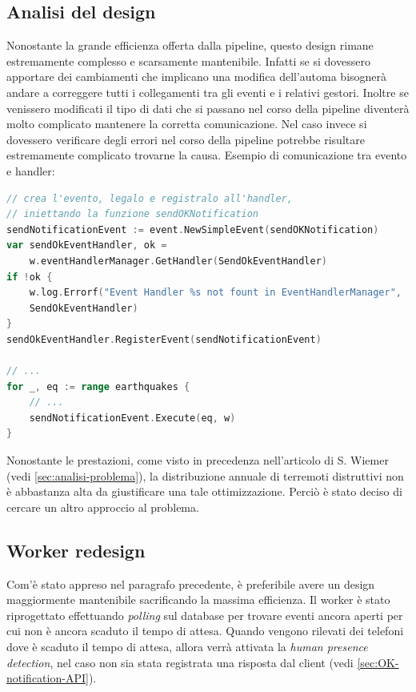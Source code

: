 \documentclass[main.tex]{subfiles}
\begin{document}
\subsection{Analisi del design}
Nonostante la grande efficienza offerta dalla pipeline, questo design rimane estremamente complesso e scarsamente mantenibile. Infatti se si dovessero apportare dei cambiamenti che implicano una modifica dell'automa bisognerà andare a correggere tutti i collegamenti tra gli eventi e i relativi gestori. Inoltre se venissero modificati il tipo di dati che si passano nel corso della pipeline diventerà molto complicato mantenere la corretta comunicazione. Nel caso invece si dovessero verificare degli errori nel corso della pipeline potrebbe risultare estremamente complicato trovarne la causa.\newline
Esempio di comunicazione tra evento e handler: %
\begin{lstlisting}[language=go]
// crea l'evento, legalo e registralo all'handler, 
// iniettando la funzione sendOKNotification
sendNotificationEvent := event.NewSimpleEvent(sendOKNotification)
var sendOkEventHandler, ok = 
    w.eventHandlerManager.GetHandler(SendOkEventHandler)
if !ok {
    w.log.Errorf("Event Handler %s not fount in EventHandlerManager", 
    SendOkEventHandler)
}
sendOkEventHandler.RegisterEvent(sendNotificationEvent)

// ...
for _, eq := range earthquakes {
    // ...
    sendNotificationEvent.Execute(eq, w)
}
\end{lstlisting}
Nonostante le prestazioni, come visto in precedenza nell’articolo di S. Wiemer (vedi \ref{sec:analisi-problema}), la distribuzione annuale di terremoti distruttivi non è abbastanza alta da giustificare una tale ottimizzazione. Perciò è stato deciso di cercare un altro approccio al problema.
\subsection{Worker redesign}
Com'è stato appreso nel paragrafo precedente, è preferibile avere un design maggiormente mantenibile sacrificando la massima efficienza.\newline
Il worker è stato riprogettato effettuando \emph{polling} sul database per trovare eventi ancora aperti per cui non è ancora scaduto il tempo di attesa. Quando vengono rilevati dei telefoni dove è scaduto il tempo di attesa, allora verrà attivata la \emph{human presence detection}, nel caso non sia stata registrata una risposta dal client (vedi \ref{sec:OK-notification-API}). \newline
\end{document}
